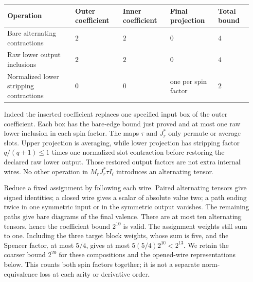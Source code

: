 \documentclass[
  english,
  11pt,
  reqno]{amsart}
\newcounter{none} %
\begin{document}
{\def\LTcaptype{none} %
\begin{longtable}[]{@{}
  >{\raggedright\arraybackslash}p{}
  >{\raggedleft\arraybackslash}p{}
  >{\raggedleft\arraybackslash}p{}
  >{\raggedleft\arraybackslash}p{}
  >{\raggedleft\arraybackslash}p{}@{}}
\toprule\noalign{}
\begin{minipage}[b]{\linewidth}\raggedright
Operation
\end{minipage} & \begin{minipage}[b]{\linewidth}\raggedleft
Outer coefficient
\end{minipage} & \begin{minipage}[b]{\linewidth}\raggedleft
Inner coefficient
\end{minipage} & \begin{minipage}[b]{\linewidth}\raggedleft
Final projection
\end{minipage} & \begin{minipage}[b]{\linewidth}\raggedleft
Total bound
\end{minipage} \\
\midrule\noalign{}
\endhead
\bottomrule\noalign{}
\endlastfoot
Bare alternating contractions & \(2\) & \(2\) & \(0\) & \(4\) \\
Raw lower output inclusions & \(2\) & \(2\) & \(0\) & \(4\) \\
Normal\-ized lower stripping contractions & \(0\) & \(0\) & one per spin
factor & \(2\) \\
\end{longtable}
}

Indeed the inserted coefficient replaces one specified input box of the
outer coefficient. Each box has the bare-edge bound just proved and at
most one raw lower inclusion in each spin factor. The maps \(\tau\) and
\(J_r^*\) only permute or average slots. Upper projection is averaging,
while lower projection has stripping factor \(q/(q+1)\le1\) times one
normalized slot contraction before restoring the declared raw lower
output. Those restored output factors are not extra internal wires. No
other operation in \(M_rJ_r^*\tau I_i\) introduces an alternating
tensor.

Reduce a fixed assignment by following each wire. Paired alternating
tensors give signed identities; a closed wire gives a scalar of absolute
value two; a path ending twice in one symmetric input or in the
symmetric output vanishes. The remaining paths give bare diagrams of the
final valence. There are at most ten alternating tensors, hence the
coefficient bound \(2^{10}\) is valid. The assignment weights still sum
to one. Including the three target block weights, whose sum is five, and
the Spencer factor, at most \(5/4\), gives at most
\(5(5/4)2^{10}<2^{13}\). We retain the coarser bound \(2^{20}\) for
these compositions and the opened-wire representations below. This
counts both spin factors together; it is not a separate norm-equivalence
loss at each arity or derivative order.
\end{document}
